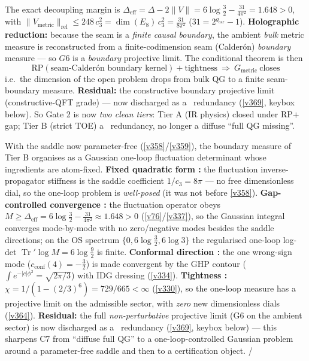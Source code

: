 \documentclass[11pt,a4paper]{article}
\newcommand{\cthree}{c_3}
\newcommand{\gcar}{g_{\mathrm{car}}}
\begin{document}
\begin{keybox}
The exact decoupling margin is $\Delta_{\mathrm{eff}}=\Delta-2\|V\|=6\log\tfrac32-\tfrac{31}{4\pi^2}=1.648>0$,
with $\|V_{\mathrm{metric}}\|_{\mathrm{rel}}\le248\,\cthree^2=\dim(E_8)\,\cthree^2=\tfrac{31}{8\pi^2}$
($31=2^{\gcar}-1$). \textbf{Holographic reduction:} because the seam is a \emph{finite causal boundary}, the
ambient \emph{bulk} metric measure is reconstructed from a finite-codimension seam (Calder\'on) \emph{boundary}
measure --- so $G6$ is a \emph{boundary} projective limit. The conditional theorem is then
\[
  \boxed{\ \mathrm{RP}(\text{seam-Calder\'on boundary kernel})+\text{tightness}\ \Longrightarrow\ G_{\mathrm{metric}}\ \text{closes}\ }
\]
i.e.\ the dimension of the open problem drops from bulk QG to a finite seam-boundary measure. \textbf{Residual:}
the constructive boundary projective limit (constructive-QFT grade) --- now discharged as a \mC\ redundancy
(\vref{v369}, keybox below). So Gate 2 is now
\emph{two clean tiers}: Tier A (IR physics) closed under RP$+$gap; Tier B (strict TOE) a \mC\ redundancy, no
longer a diffuse ``full QG missing''. \mC
\end{keybox}

\begin{keybox}
With the saddle now parameter-free (\vref{v358}/\vref{v359}), the boundary measure of Tier B organises as a
Gaussian one-loop fluctuation determinant whose ingredients are atom-fixed. \textbf{Fixed quadratic form \mE:}
the fluctuation inverse-propagator stiffness is the saddle coefficient $1/\cthree=8\pi$ --- no free dimensionless
dial, so the one-loop problem is \emph{well-posed} (it was not before \vref{v358}). \textbf{Gap-controlled
convergence \mE:} the fluctuation operator obeys
$M\ge\Delta_{\mathrm{eff}}=6\log\tfrac32-\tfrac{31}{4\pi^2}\approx1.648>0$ (\vref{v76}/\vref{v337}), so the Gaussian
integral converges mode-by-mode with no zero/negative modes besides the saddle directions; on the OS spectrum
$\{0,6\log\tfrac32,6\log3\}$ the regularised one-loop log-det $\operatorname{Tr}'\log M=6\log\tfrac92$ is finite.
\textbf{Conformal direction \mC:} the one wrong-sign mode ($c_{\mathrm{conf}}(4)=-\tfrac32$) is made convergent by
the GHP contour ($\int e^{-|c|\phi^2}=\sqrt{2\pi/3}$) with IDG dressing (\vref{v334}). \textbf{Tightness \mE:}
$\chi=1/(1-(2/3)^6)=729/665<\infty$ (\vref{v330}), so the one-loop measure has a projective limit on the
admissible sector, with \emph{zero} new dimensionless dials (\vref{v364}). \textbf{Residual:} the full
\emph{non-perturbative} projective limit (G6 on the ambient sector) is now discharged as a \mC\ redundancy
(\vref{v369}, keybox below) --- this sharpens C7 from
``diffuse full QG'' to a one-loop-controlled Gaussian problem around a parameter-free saddle and then to a
certification object. \mE/\mC
\end{keybox}
\end{document}
